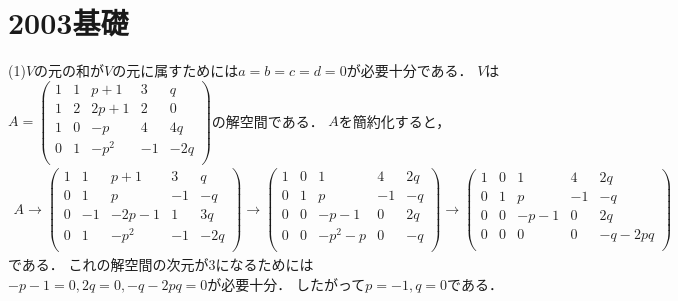\documentclass[
		book,
		head_space=20mm,
		foot_space=20mm,
		gutter=10mm,
		line_length=190mm
]{jlreq}
\begin{document}
\section{2003基礎}
(1)$V$の元の和が$V$の元に属すためには$a=b=c=d=0$が必要十分である．
$V$は$A=\begin{pmatrix}
1&1&p+1&3&q\\
1&2&2p+1&2&0\\
1&0&-p&4&4q\\
0&1&-p^2&-1&-2q\\
\end{pmatrix}$の解空間である．
$A$を簡約化すると，\begin{align}
    A\to \begin{pmatrix}
    1&1&p+1&3&q\\
    0&1&p&-1&-q\\
    0&-1&-2p-1&1&3q\\
    0&1&-p^2&-1&-2q\\
    \end{pmatrix}\to \begin{pmatrix}
    1&0&1&4&2q\\
    0&1&p&-1&-q\\
    0&0&-p-1&0&2q\\
    0&0&-p^2-p&0&-q\\
    \end{pmatrix}\to\begin{pmatrix}
    1&0&1&4&2q\\
    0&1&p&-1&-q\\
    0&0&-p-1&0&2q\\
    0&0&0&0&-q-2pq\\
    \end{pmatrix}
\end{align}である．
これの解空間の次元が$3$になるためには$-p-1=0,2q=0,-q-2pq=0$が必要十分．
したがって$p=-1,q=0$である．
\end{document}
